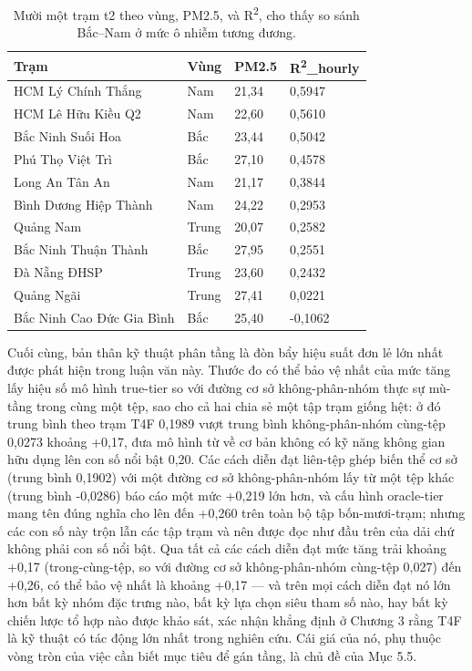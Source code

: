{\small
\begin{longtable}{llll}
\caption{Mười một trạm t2 theo vùng, PM2.5, và R\textsuperscript{2}, cho thấy so sánh Bắc--Nam ở mức ô nhiễm tương đương.}\\
\toprule
\textbf{Trạm} & \textbf{Vùng} & \textbf{PM2.5} & \textbf{R\textsuperscript{2}\_hourly} \\
\midrule\endhead
HCM Lý Chính Thắng & Nam & 21,34 & 0,5947 \\
HCM Lê Hữu Kiều Q2 & Nam & 22,60 & 0,5610 \\
Bắc Ninh Suối Hoa & Bắc & 23,44 & 0,5042 \\
Phú Thọ Việt Trì & Bắc & 27,10 & 0,4578 \\
Long An Tân An & Nam & 21,17 & 0,3844 \\
Bình Dương Hiệp Thành & Nam & 24,22 & 0,2953 \\
Quảng Nam & Trung & 20,07 & 0,2582 \\
Bắc Ninh Thuận Thành & Bắc & 27,95 & 0,2551 \\
Đà Nẵng ĐHSP & Trung & 23,60 & 0,2432 \\
Quảng Ngãi & Trung & 27,41 & 0,0221 \\
Bắc Ninh Cao Đức Gia Bình & Bắc & 25,40 & -0,1062 \\
\bottomrule
\end{longtable}
}


Cuối cùng, bản thân kỹ thuật phân tầng là đòn bẩy hiệu suất đơn lẻ lớn nhất được phát hiện trong luận văn này. Thước đo có thể bảo vệ nhất của mức tăng lấy hiệu số mô hình true-tier so với đường cơ sở không-phân-nhóm thực sự mù-tầng trong cùng một tệp, sao cho cả hai chia sẻ một tập trạm giống hệt: ở đó trung bình theo trạm T4F 0,1989 vượt trung bình không-phân-nhóm cùng-tệp 0,0273 khoảng +0,17, đưa mô hình từ về cơ bản không có kỹ năng không gian hữu dụng lên con số nổi bật 0,20. Các cách diễn đạt liên-tệp ghép biến thể cơ sở (trung bình 0,1902) với một đường cơ sở không-phân-nhóm lấy từ một tệp khác (trung bình -0,0286) báo cáo một mức +0,219 lớn hơn, và cấu hình oracle-tier mang tên đúng nghĩa cho lên đến +0,260 trên toàn bộ tập bốn-mươi-trạm; nhưng các con số này trộn lẫn các tập trạm và nên được đọc như đầu trên của dải chứ không phải con số nổi bật. Qua tất cả các cách diễn đạt mức tăng trải khoảng +0,17 (trong-cùng-tệp, so với đường cơ sở không-phân-nhóm cùng-tệp 0,027) đến +0,26, có thể bảo vệ nhất là khoảng +0,17 --- và trên mọi cách diễn đạt nó lớn hơn bất kỳ nhóm đặc trưng nào, bất kỳ lựa chọn siêu tham số nào, hay bất kỳ chiến lược tổ hợp nào được khảo sát, xác nhận khẳng định ở Chương 3 rằng T4F là kỹ thuật có tác động lớn nhất trong nghiên cứu. Cái giá của nó, phụ thuộc vòng tròn của việc cần biết mục tiêu để gán tầng, là chủ đề của Mục 5.5.

